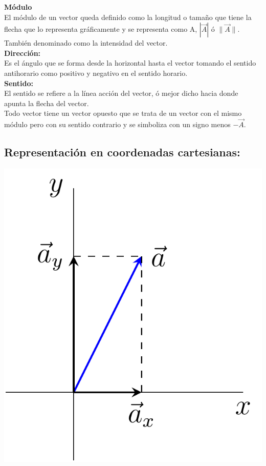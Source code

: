\documentclass[a5paper,pagesize,10pt,bibtotoc,pointlessnumbers,
normalheadings,DIV=9,fleqn,x11names,table,twoside=false]{scrbook}
\begin{document}
\textbf{Módulo}\\

El módulo de un vector queda definido como la longitud o tamaño que tiene la flecha que lo representa gráficamente y se 
representa como A, $|\vec{A}|$ ó $\|\vec{A}\|$. También denominado como la intensidad del vector.\\

\textbf{Dirección:}\\

Es el ángulo que se forma desde la horizontal hasta el vector tomando el sentido antihorario como positivo y negativo 
en el sentido horario.\\

\textbf{Sentido:}\\

El sentido se refiere a la línea acción del vector, ó mejor dicho hacia donde apunta la flecha del vector.\\

Todo vector tiene un vector opuesto que se trata de un vector con el mismo módulo pero con su sentido contrario y se 
simboliza con un signo menos $-\vec{A}$.\\

\subsection{Representación en coordenadas cartesianas:}

\begin{center}
 \includegraphics[scale = 0.3]{images/Vector_in_2D_space.png}
\end{center}
\end{document}
